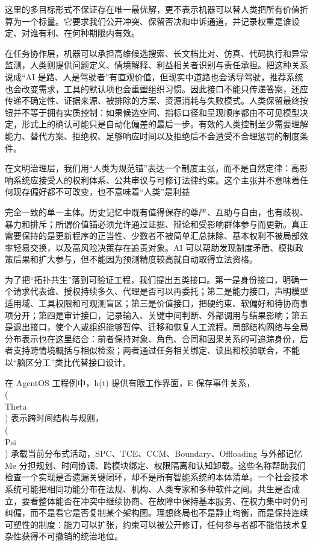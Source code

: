 这里的多目标形式不保证存在唯一最优解，更不表示机器可以替人类把所有价值折算为一个标量。它要求我们公开冲突、保留否决和申诉通道，并记录权重是谁设定、对谁有利、在何种期限内有效。

在任务协作层，机器可以承担高维候选搜索、长文档比对、仿真、代码执行和异常监测，人类则提供问题定义、情境解释、利益相关者识别与责任承担。把这种关系说成“AI 是路、人是驾驶者”有直观价值，但现实中道路也会诱导驾驶，推荐系统也会改变需求，工具的默认项也会重塑组织习惯。因此接口不能只传递答案，还应传递不确定性、证据来源、被排除的方案、资源消耗与失败模式。人类保留最终按钮并不等于拥有实质控制：如果候选空间、指标口径和呈现顺序都由不可见模型决定，形式上的确认可能只是自动化偏差的最后一步。有效的人类控制至少需要理解能力、替代方案、拒绝权、足够响应时间以及拒绝后不会遭受不合理惩罚的制度条件。

在文明治理层，我们用“人类为规范锚”表达一个制度主张，而不是自然定律：高影响系统应接受人的权利体系、公共审议与可修订法律约束。这个主张并不意味着任何现存偏好都不可改变，也不意味着“人类”是利益

完全一致的单一主体。历史记忆中既有值得保存的尊严、互助与自由，也有歧视、暴力和排斥；所谓价值锚必须允许通过证据、辩论和受影响群体参与而更新。真正需要保持的是更新程序的正当性、少数者不被简单汇总抹除、基本权利不被局部效率轻易交换，以及高风险决策存在追责对象。AI 可以帮助发现制度矛盾、模拟政策后果和扩大参与，但不能因为预测精度较高就自动取得立法资格。

为了把“拓扑共生”落到可验证工程，我们提出五类接口。第一是身份接口，明确一个请求代表谁、授权持续多久、代理是否可以再委托；第二是能力接口，声明模型适用域、工具权限和可观测盲区；第三是价值接口，把硬约束、软偏好和待协商事项分开；第四是审计接口，记录输入、关键中间判断、外部调用与结果影响；第五是退出接口，使个人或组织能够暂停、迁移和恢复人工流程。局部结构网络与全局分布表示也在这里结合：前者保持对象、角色、合同和因果关系的可追踪身份，后者支持跨情境概括与相似检索；两者通过任务相关绑定、读出和校验联合，不能以“脑区分工”类比代替接口设计。

在 AgentOS 工程例中，h(t) 提供有限工作界面，E 保存事件关系，\\(\\Theta\\) 表示跨时间结构与规则，\\(\\Psi\\) 承载当前分布式活动，SPC、TCE、CCM、Boundary、Offloading 与外部记忆 Me 分担规划、时间协调、跨模块绑定、权限隔离和认知卸载。这些名称帮助我们检查一个实现是否遗漏关键闭环，却不是所有智能系统的本体清单。一个社会技术系统可能把相同功能分布在法规、机构、人类专家和多种软件之间。共生是否成立，要看整体能否在冲突中继续协商、在故障中保持基本服务、在权力集中时仍可纠偏，而不是看它是否复制某个架构图。理想终局也不是静止均衡，而是保持连续可塑性的制度：能力可以扩张，约束可以被公开修订，任何参与者都不能借技术复杂性获得不可撤销的统治地位。

